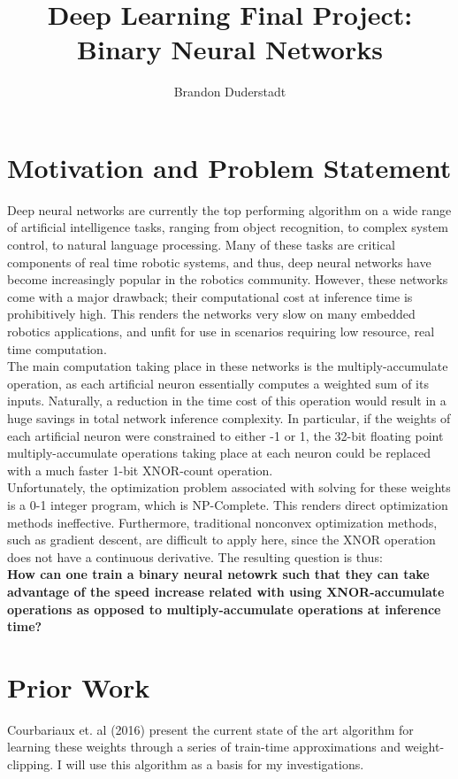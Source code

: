 \documentclass{article}
\title{Deep Learning Final Project: Binary Neural Networks}
\author{Brandon Duderstadt}
\begin{document}
  \maketitle
  \section{Motivation and Problem Statement}

    Deep neural networks are currently the top performing algorithm on a wide range of artificial intelligence tasks, ranging from object recognition, to complex system control, to natural language processing.
    Many of these tasks are critical components of real time robotic systems, and thus, deep neural networks have become increasingly popular in the robotics community.
    However, these networks come with a major drawback; their computational cost at inference time is prohibitively high.
    This renders the networks very slow on many embedded robotics applications, and unfit for use in scenarios requiring low resource, real time computation.\\[6pt]

    The main computation taking place in these networks is the multiply-accumulate operation, as each artificial neuron essentially computes a weighted sum of its inputs.
    Naturally, a reduction in the time cost of this operation would result in a huge savings in total network inference complexity.
    In particular, if the weights of each artificial neuron were constrained to either -1 or 1, the 32-bit floating point multiply-accumulate operations taking place at each neuron could be replaced with a much faster 1-bit XNOR-count operation.\\[6pt]

    Unfortunately, the optimization problem associated with solving for these weights is a 0-1 integer program, which is NP-Complete.
    This renders direct optimization methods ineffective. Furthermore, traditional nonconvex optimization methods, such as gradient descent, are difficult to apply here, since the XNOR operation does not have a continuous derivative.
    The resulting question is thus: \\[6pt]
    \textbf{How can one train a binary neural netowrk such that they can take advantage of the speed increase related with using XNOR-accumulate operations as opposed to multiply-accumulate operations at inference time?}

  \section{Prior Work}
    Courbariaux et. al (2016) \cite{bnn} present the current state of the art algorithm for learning these weights through a series of train-time approximations and weight-clipping. I will use this algorithm as a basis for my investigations.
\end{document}
